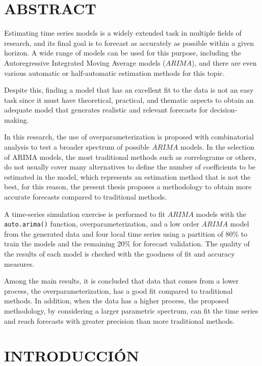 \documentclass[
]{article}
\begin{document}
\cleardoublepage

\section*{ABSTRACT}

Estimating time series models is a widely extended task in multiple
fields of research, and its final goal is to forecast as accurately as
possible within a given horizon. A wide range of models can be used for
this purpose, including the Autoregressive Integrated Moving Average
models (\(ARIMA\)), and there are even various automatic or
half-automatic estimation methods for this topic.

Despite this, finding a model that has an excellent fit to the data is
not an easy task since it must have theoretical, practical, and thematic
aspects to obtain an adequate model that generates realistic and
relevant forecasts for decision-making.

In this research, the use of overparameterization is proposed with
combinatorial analysis to test a broader spectrum of possible \(ARIMA\)
models. In the selection of ARIMA models, the most traditional methods
such as correlograms or others, do not usually cover many alternatives
to define the number of coefficients to be estimated in the model, which
represents an estimation method that is not the best, for this reason,
the present thesis proposes a methodology to obtain more accurate
forecasts compared to traditional methods.

A time-series simulation exercise is performed to fit \(ARIMA\) models
with the \texttt{auto.arima()} function, overparameterization, and a low
order \(ARIMA\) model from the generated data and four local time series
using a partition of 80\% to train the models and the remaining 20\% for
forecast validation. The quality of the results of each model is checked
with the goodness of fit and accuracy measures.

Among the main results, it is concluded that data that comes from a
lower process, the overparameterization, has a good fit compared to
traditional methods. In addition, when the data has a higher process,
the proposed methodology, by considering a larger parametric spectrum,
can fit the time series and reach forecasts with greater precision than
more traditional methods.

\cleardoublepage

\section{INTRODUCCIÓN}
\end{document}
